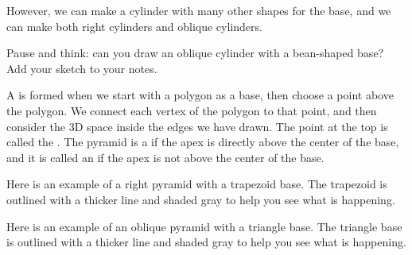 \documentclass{ximera}
\begin{document}
However, we can make a cylinder with many other shapes for the base, and we can make both right cylinders and oblique cylinders.

\begin{question}
Pause and think: can you draw an oblique cylinder with a bean-shaped base? Add your sketch to your notes.
\end{question}


\begin{definition}
A  is formed when we start with a polygon as a base, then choose a point above the polygon. We connect each vertex of the polygon to that point, and then consider the 3D space inside the edges we have drawn. The point at the top is called the . The pyramid is a  if the apex is directly above the center of the base, and it is called an  if the apex is not above the center of the base.

Here is an example of a right pyramid with a trapezoid base. The trapezoid is outlined with a thicker line and shaded gray to help you see what is happening.
\begin{image}
\end{image}

Here is an example of an oblique pyramid with a triangle base. The triangle base is outlined with a thicker line and shaded gray to help you see what is happening.
\begin{image}
\end{image}

\end{definition}
\end{document}
